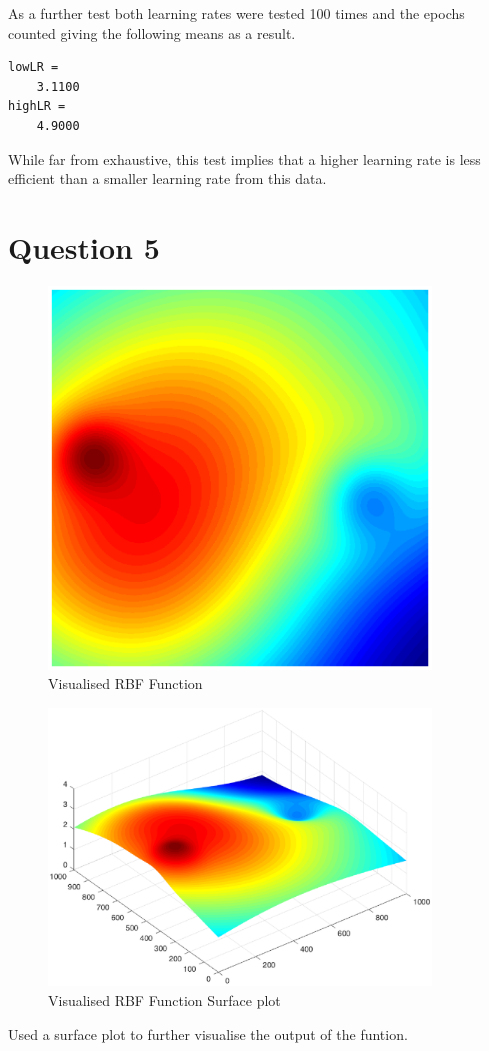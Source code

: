 \documentclass{article}
\begin{document}
As a further test both learning rates were tested 100 times and the epochs counted giving the following means as a result.

\begin{lstlisting}
lowLR =
	3.1100
highLR =
	4.9000
\end{lstlisting}

While far from exhaustive, this test implies that a higher learning rate is less efficient than a smaller learning rate from this data.

\section*{Question 5}


\begin{figure}[H]
\centering
\includegraphics[width=4in]{ass2Code/5.eps}
\caption{Visualised RBF Function}
\end{figure}
\begin{figure}[H]
\centering
\includegraphics[width=4in]{ass2Code/5b.eps}
\caption{Visualised RBF Function Surface plot}
\end{figure}
Used a surface plot to further visualise the output of the funtion.
\end{document}
